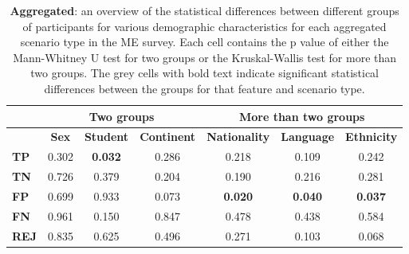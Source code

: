 \begin{table}[H]
    \small
    \centering
    \begin{tabular}{lccc|ccc}
        \toprule
                     & \multicolumn{3}{c}{\textbf{Two groups}} & \multicolumn{3}{c}{\textbf{More than two groups}}                                                                                                                                                                       \\
        \midrule
                     & \multicolumn{1}{c}{\textbf{Sex}}        & \multicolumn{1}{c}{\textbf{Student}}              & \multicolumn{1}{c}{\textbf{Continent}} & \multicolumn{1}{c}{\textbf{Nationality}} & \multicolumn{1}{c}{\textbf{Language}}  & \multicolumn{1}{c}{\textbf{Ethnicity}} \\
        \midrule
        \textbf{TP}  & 0.302                                   & \cellcolor[HTML]{EFEFEF}\textbf{0.032}            & 0.286                                  & 0.218                                    & 0.109                                  & 0.242                                  \\
        \textbf{TN}  & 0.726                                   & 0.379                                             & 0.204                                  & 0.190                                    & 0.216                                  & 0.281                                  \\
        \textbf{FP}  & 0.699                                   & 0.933                                             & 0.073                                  & \cellcolor[HTML]{EFEFEF}\textbf{0.020}   & \cellcolor[HTML]{EFEFEF}\textbf{0.040} & \cellcolor[HTML]{EFEFEF}\textbf{0.037} \\
        \textbf{FN}  & 0.961                                   & 0.150                                             & 0.847                                  & 0.478                                    & 0.438                                  & 0.584                                  \\
        \textbf{REJ} & 0.835                                   & 0.625                                             & 0.496                                  & 0.271                                    & 0.103                                  & 0.068                                  \\
        \bottomrule
    \end{tabular}
    \caption{\textbf{Aggregated}: an overview of the statistical differences between different groups of participants for various demographic characteristics for each aggregated scenario type in the ME survey. Each cell contains the p value of either the Mann-Whitney U test for two groups or the Kruskal-Wallis test for more than two groups. The grey cells with bold text indicate significant statistical differences between the groups for that feature and scenario type.}
    \label{tab:results-differences-grp}
\end{table}

